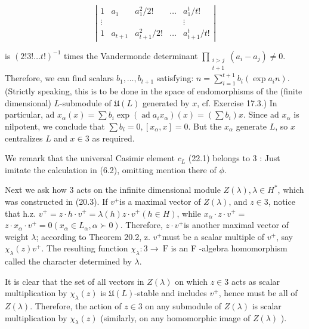 \documentclass[10pt]{article}
\begin{document}
$$
\left|\begin{array}{ccccc}
1 & a_{1} & a_{1}^{2} / 2! & \ldots & a_{1}^{t} / t! \\
\vdots & & & & \vdots \\
1 & a_{t+1} & a_{t+1}^{2} / 2! & \ldots & a_{t+1}^{t} / t!
\end{array}\right|
$$

is $(2!3!\ldots t!)^{-1}$ times the Vandermonde determinant $\prod_{\substack{i>j \\ t+1}}\left(a_{i}-a_{j}\right) \neq 0$.\\
Therefore, we can find scalars $b_{1}, \ldots, b_{t+1}$ satisfying: $n=\sum_{i=1}^{t+1} b_{i}\left(\exp a_{i} n\right)$. (Strictly speaking, this is to be done in the space of endomorphisms of the (finite dimensional) $L$-submodule of $\mathfrak{U}(L)$ generated by $x$, cf. Exercise 17.3.) In particular, ad $x_{\alpha}(x)=\sum b_{i} \exp \left(\operatorname{ad} a_{i} x_{\alpha}\right)(x)=\left(\sum b_{i}\right) x$. Since ad $x_{\alpha}$ is nilpotent, we conclude that $\sum b_{i}=0,\left[x_{\alpha}, x\right]=0$. But the $x_{\alpha}$ generate $L$, so $x$ centralizes $L$ and $x \in 3$ as required.

We remark that the universal Casimir element $c_{L}$ (22.1) belongs to 3 : Just imitate the calculation in (6.2), omitting mention there of $\phi$.

Next we ask how 3 acts on the infinite dimensional module $Z(\lambda), \lambda \in H^{*}$, which was constructed in (20.3). If $v^{+}$is a maximal vector of $Z(\lambda)$, and $z \in \mathcal{3}$, notice that h.z. $v^{+}=z \cdot h \cdot v^{+}=\lambda(h) z \cdot v^{+}(h \in H)$, while $x_{\alpha} \cdot z \cdot v^{+}=$ $z \cdot x_{\alpha} \cdot v^{+}=0\left(x_{\alpha} \in L_{\alpha}, \alpha \succ 0\right)$. Therefore, $z \cdot v^{+}$is another maximal vector of weight $\lambda$; according to Theorem 20.2, z. $v^{+}$must be a scalar multiple of $v^{+}$, say $\chi_{\lambda}(z) v^{+}$. The resulting function $\chi_{\lambda}: 3 \rightarrow \mathrm{~F}$ is an F -algebra homomorphism called the character determined by $\lambda$.

It is clear that the set of all vectors in $Z(\lambda)$ on which $z \in 3$ acts as scalar multiplication by $\chi_{\lambda}(z)$ is $\mathfrak{U}(L)$-stable and includes $v^{+}$, hence must be all of $Z(\lambda)$. Therefore, the action of $z \in 3$ on any submodule of $Z(\lambda)$ is scalar multiplication by $\chi_{\lambda}(z)$ (similarly, on any homomorphic image of $Z(\lambda)$ ).
\end{document}
